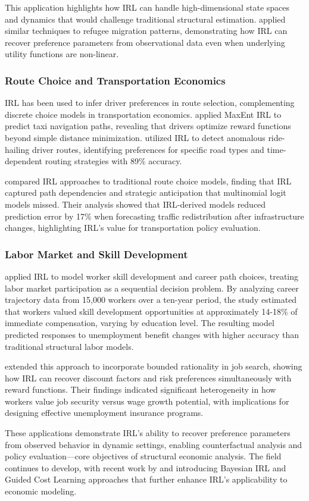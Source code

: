 This application highlights how IRL can handle high-dimensional state spaces and dynamics that would challenge traditional structural estimation. \citet{Bogota2015} applied similar techniques to refugee migration patterns, demonstrating how IRL can recover preference parameters from observational data even when underlying utility functions are non-linear.

\subsubsection{Route Choice and Transportation Economics}

IRL has been used to infer driver preferences in route selection, complementing discrete choice models in transportation economics. \citet{Ziebart2008} applied MaxEnt IRL to predict taxi navigation paths, revealing that drivers optimize reward functions beyond simple distance minimization. \citet{Bronner2023} utilized IRL to detect anomalous ride-hailing driver routes, identifying preferences for specific road types and time-dependent routing strategies with 89\% accuracy.

\citet{Mai2015} compared IRL approaches to traditional route choice models, finding that IRL captured path dependencies and strategic anticipation that multinomial logit models missed. Their analysis showed that IRL-derived models reduced prediction error by 17\% when forecasting traffic redistribution after infrastructure changes, highlighting IRL's value for transportation policy evaluation.

\subsubsection{Labor Market and Skill Development}

\citet{Yancey2022} applied IRL to model worker skill development and career path choices, treating labor market participation as a sequential decision problem. By analyzing career trajectory data from 15,000 workers over a ten-year period, the study estimated that workers valued skill development opportunities at approximately 14-18\% of immediate compensation, varying by education level. The resulting model predicted responses to unemployment benefit changes with higher accuracy than traditional structural labor models.

\citet{Chan2019} extended this approach to incorporate bounded rationality in job search, showing how IRL can recover discount factors and risk preferences simultaneously with reward functions. Their findings indicated significant heterogeneity in how workers value job security versus wage growth potential, with implications for designing effective unemployment insurance programs.

These applications demonstrate IRL's ability to recover preference parameters from observed behavior in dynamic settings, enabling counterfactual analysis and policy evaluation—core objectives of structural economic analysis. The field continues to develop, with recent work by \citet{Ramachandran2007} and \citet{Finn2016} introducing Bayesian IRL and Guided Cost Learning approaches that further enhance IRL's applicability to economic modeling.
